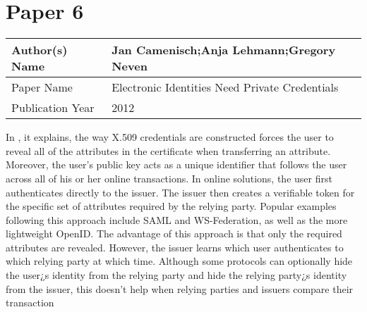 \section{Paper 6}
    \begin{center}
    \begin{tabular}{ | m{5em} | m{25em} |} 
      \hline
      Author(s) Name & Jan Camenisch;Anja Lehmann;Gregory Neven \\ 
      \hline
      Paper Name & Electronic Identities Need Private Credentials \\ 
      \hline
      Publication Year & 2012 \\ 
      \hline
    \end{tabular}
    \end{center}
    In \cite{6142524}, it explains, the way X.509 credentials are constructed forces the user to reveal all of the attributes in the certificate when transferring an attribute. Moreover, the user's public key acts as a unique identifier that follows the user across all of his or her online transactions.  In online solutions, the user first authenticates directly to the issuer. The issuer then creates a verifiable token for the specific set of attributes required by the relying party. Popular examples following this approach include \ac{SAML} and WS-Federation, as well as the more lightweight OpenID. The advantage of this approach is that only the required attributes are revealed. However, the issuer learns which user authenticates to which relying party at which time. Although some protocols can optionally hide the user¿s identity from the relying party and hide the relying party¿s identity from the issuer, this doesn't help when relying parties and issuers compare their transaction